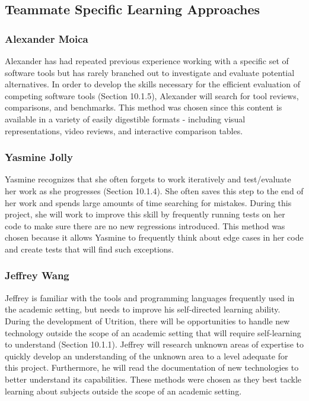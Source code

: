 \documentclass[12pt]{article}
\begin{document}
\subsection{Teammate Specific Learning Approaches}
\subsubsection{Alexander Moica}
Alexander has had repeated previous experience working with a specific set of software tools but has rarely branched out to investigate and evaluate potential alternatives. In order to develop the skills necessary for the efficient evaluation of competing software tools (Section 10.1.5), Alexander will search for tool reviews, comparisons, and benchmarks. This method was chosen since this content is available in a variety of easily digestible formats - including visual representations, video reviews, and interactive comparison tables.

\subsubsection{Yasmine Jolly}
Yasmine recognizes that she often forgets to work iteratively and test/evaluate her work as she progresses (Section 10.1.4). She often saves this step to the end of her work and spends large amounts of time searching for mistakes. During this project, she will work to improve this skill by frequently running tests on her code to make sure there are no new regressions introduced. This method was chosen because it allows Yasmine to frequently think about edge cases in her code and create tests that will find such exceptions.

\subsubsection{Jeffrey Wang}
Jeffrey is familiar with the tools and programming languages frequently 
used in the academic setting, but needs to improve his self-directed learning 
ability. During the development of Utrition, there will be opportunities to 
handle new technology outside the scope of an academic setting that will 
require self-learning to understand (Section 10.1.1). Jeffrey will research 
unknown areas of expertise to quickly develop an understanding of the unknown 
area to a level adequate for this project. Furthermore, he will read the 
documentation of new technologies to better understand its capabilities. These 
methods were chosen as they best tackle learning about subjects outside the 
scope of an academic setting.
\end{document}
